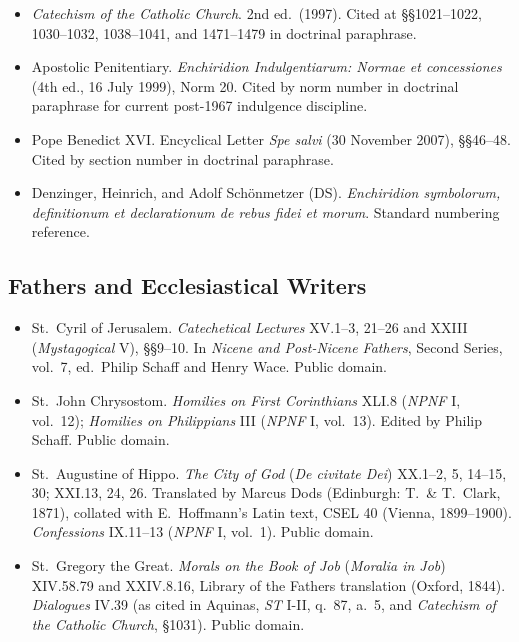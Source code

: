 \begin{itemize}
\item \textit{Catechism of the Catholic Church}. 2nd ed.\ (1997). Cited at \S\S 1021--1022, 1030--1032, 1038--1041, and 1471--1479 in doctrinal paraphrase.
\item Apostolic Penitentiary. \textit{Enchiridion Indulgentiarum: Normae et concessiones} (4th ed., 16 July 1999), Norm 20. Cited by norm number in doctrinal paraphrase for current post-1967 indulgence discipline.
\item Pope Benedict XVI. Encyclical Letter \textit{Spe salvi} (30 November 2007), \S\S 46--48. Cited by section number in doctrinal paraphrase.
\item Denzinger, Heinrich, and Adolf Sch\"{o}nmetzer (DS). \textit{Enchiridion symbolorum, definitionum et declarationum de rebus fidei et morum}. Standard numbering reference.
\end{itemize}

\subsection*{Fathers and Ecclesiastical Writers}

\begin{itemize}
\item St.\ Cyril of Jerusalem. \textit{Catechetical Lectures} XV.1--3, 21--26 and XXIII (\textit{Mystagogical} V), \S\S 9--10. In \textit{Nicene and Post-Nicene Fathers}, Second Series, vol.\ 7, ed.\ Philip Schaff and Henry Wace. Public domain.
\item St.\ John Chrysostom. \textit{Homilies on First Corinthians} XLI.8 (\textit{NPNF} I, vol.\ 12); \textit{Homilies on Philippians} III (\textit{NPNF} I, vol.\ 13). Edited by Philip Schaff. Public domain.
\item St.\ Augustine of Hippo. \textit{The City of God} (\textit{De civitate Dei}) XX.1--2, 5, 14--15, 30; XXI.13, 24, 26. Translated by Marcus Dods (Edinburgh: T.\ \& T.\ Clark, 1871), collated with E.\ Hoffmann's Latin text, CSEL 40 (Vienna, 1899--1900). \textit{Confessions} IX.11--13 (\textit{NPNF} I, vol.\ 1). Public domain.
\item St.\ Gregory the Great. \textit{Morals on the Book of Job} (\textit{Moralia in Job}) XIV.58.79 and XXIV.8.16, Library of the Fathers translation (Oxford, 1844). \textit{Dialogues} IV.39 (as cited in Aquinas, \textit{ST} I-II, q.\ 87, a.\ 5, and \textit{Catechism of the Catholic Church}, \S 1031). Public domain.
\end{itemize}

